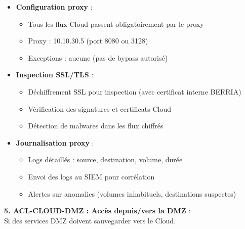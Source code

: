 \begin{itemize}
  \item \textbf{Configuration proxy} :
  \begin{itemize}
    \item Tous les flux Cloud passent obligatoirement par le proxy
    \item Proxy : 10.10.30.5 (port 8080 ou 3128)
    \item Exceptions : aucune (pas de bypass autorisé)
  \end{itemize}
  
  \item \textbf{Inspection SSL/TLS} :
  \begin{itemize}
    \item Déchiffrement SSL pour inspection (avec certificat interne BERRIA)
    \item Vérification des signatures et certificats Cloud
    \item Détection de malwares dans les flux chiffrés
  \end{itemize}
  
  \item \textbf{Journalisation proxy} :
  \begin{itemize}
    \item Logs détaillés : source, destination, volume, durée
    \item Envoi des logs au SIEM pour corrélation
    \item Alertes sur anomalies (volumes inhabituels, destinations suspectes)
  \end{itemize}
\end{itemize}

\medskip

\noindent \textbf{5. ACL-CLOUD-DMZ : Accès depuis/vers la DMZ} :\\
Si des services DMZ doivent sauvegarder vers le Cloud.

